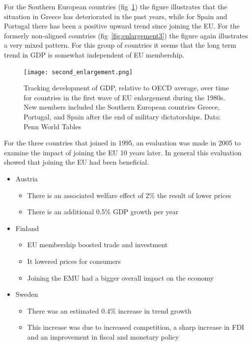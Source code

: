 \documentclass{tufte-handout}
\begin{document}
For the Southern European countries (fig~\ref{fig:enlargement2}) the figure illustrates that the situation in Greece has deteriorated in the past years, while for Spain and Portugal there has been a positive upward trend since joining the EU. 
For the formerly non-aligned countries (fig~\ref{fig:enlargement3}) the figure again illustrates a very mixed pattern. 
For this group of countries it seems that the long term trend in GDP is somewhat independent of EU membership.
\begin{figure} \centering
    \texttt{[image: second\_enlargement.png]}
    \caption{Tracking development of GDP, relative to OECD average, over time for countries in the first wave of EU enlargement during the 1980s. New members included the Southern European countries Greece, Portugal, and Spain after the end of military dictatorships. Data: Penn World Tables}
    \label{fig:enlargement2}
  \end{figure}
\clearpage
For the three countries that joined in 1995, an evaluation was made in 2005 to examine the impact of joining the EU 10 years later. 
In general this evaluation showed that joining the EU had been beneficial. 
\begin{itemize}
  \item Austria
  \begin{itemize}
    \item There is an associated welfare effect of 2\% the result of lower prices
    \item There is an additional 0.5\% GDP growth per year
  \end{itemize}
  \item Finland
  \begin{itemize}
    \item EU membership boosted trade and investment
    \item It lowered prices for consumers
    \item Joining the EMU had a bigger overall impact on the economy
  \end{itemize}
  \item Sweden
  \begin{itemize}
    \item There was an estimated 0.4\% increase in trend growth
    \item This increase was due to increased competition, a sharp increase in FDI and an improvement in fiscal and monetary policy
  \end{itemize}
\end{itemize}
\end{document}
